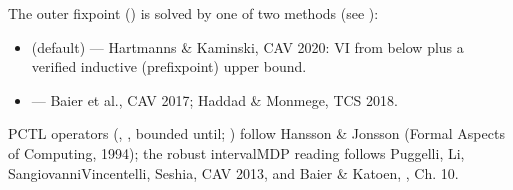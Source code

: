 \documentclass[a4paper,10pt,english]{sphinxmanual}
\begin{document}
\sphinxAtStartPar
The outer fixpoint () is solved by one of two methods (see {\hyperref[\detokenize{manual/engines::doc}]{}}):
\begin{itemize}
\item {} 
\sphinxAtStartPar
{} (default) — Hartmanns \& Kaminski, CAV 2020: VI from
below plus a verified inductive (pre\sphinxhyphen{}fixpoint) upper bound.

\item {} 
\sphinxAtStartPar
{} — Baier et al., CAV 2017;
Haddad \& Monmege, TCS 2018.

\end{itemize}

\sphinxAtStartPar
PCTL operators (, , bounded until; ) follow Hansson \& Jonsson
(Formal Aspects of Computing, 1994); the robust interval\sphinxhyphen{}MDP reading follows Puggelli,
Li, Sangiovanni\sphinxhyphen{}Vincentelli, Seshia, CAV 2013, and Baier \& Katoen, , Ch. 10.
\end{document}
